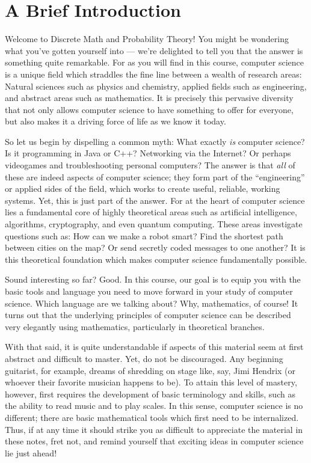 \documentclass[11pt]{article}
\newcounter{thm}
\begin{document}
\maketitle

\section{A Brief Introduction}\label{scn:intro}

Welcome to Discrete Math and Probability Theory! You might be wondering what you've gotten yourself into --- we're delighted to tell you that the answer is something quite remarkable. For as you will find in this course, computer science is a unique field which straddles the fine line between a wealth of research areas: Natural sciences such as physics and chemistry, applied fields such as engineering, and abstract areas such as mathematics. It is precisely this pervasive diversity that not only allows computer science to have something to offer for everyone, but also makes it a driving force of life as we know it today.

So let us begin by dispelling a common myth: What exactly \emph{is} computer science? Is it programming in Java or C++? Networking via the Internet? Or perhaps videogames and troubleshooting personal computers? The answer is that \emph{all} of these are indeed aspects of computer science; they form part of the ``engineering'' or applied sides of the field, which works to create useful, reliable, working systems. Yet, this is just part of the answer. For at the heart of computer science lies a fundamental core of highly theoretical areas such as artificial intelligence, algorithms, cryptography, and even quantum computing. These areas investigate questions such as: How can we make a robot smart? Find the shortest path between cities on the map? Or send secretly coded messages to one another? It is this theoretical foundation which makes computer science fundamentally possible.

Sound interesting so far? Good. In this course, our goal is to equip you with the basic tools and language you need to move forward in your study of computer science. Which language are we talking about? Why, mathematics, of course! It turns out that the underlying principles of computer science can be described very elegantly using mathematics, particularly in theoretical branches.

With that said, it is quite understandable if aspects of this material seem at first abstract and difficult to master. Yet, do not be discouraged. Any beginning guitarist, for example, dreams of shredding on stage like, say, Jimi Hendrix (or whoever their favorite musician happens to be). To attain this level of mastery, however, first requires the development of basic terminology and skills, such as the ability to read music and to play scales. In this sense, computer science is no different; there are basic mathematical tools which first need to be internalized. Thus, if at any time it should strike you as difficult to appreciate the material in these notes, fret not, and remind yourself that exciting ideas in computer science lie just ahead!
\end{document}

